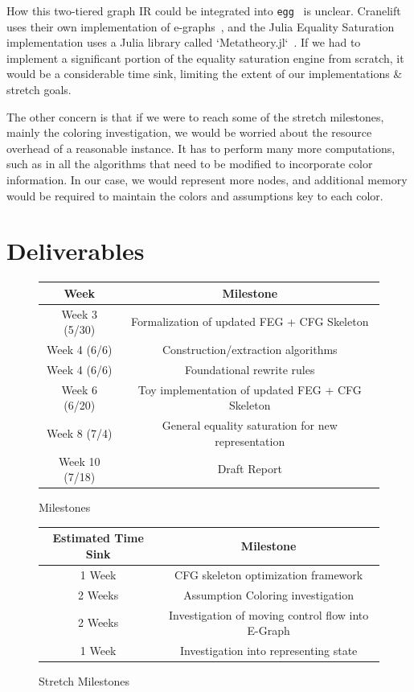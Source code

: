 \documentclass{article}
\begin{document}
How this two-tiered graph IR could be integrated into \verb|egg|~\cite{Willsey_2021} is unclear. Cranelift uses their own implementation of e-graphs~\cite{bytecodealliance_2025}, and the Julia Equality Saturation implementation uses a Julia library called `Metatheory.jl`~\cite{Cheli2021}. If we had to implement a significant portion of the equality saturation engine from scratch, it would be a considerable time sink, limiting the extent of our implementations \& stretch goals.

The other concern is that if we were to reach some of the stretch milestones, mainly the coloring investigation, we would be worried about the resource overhead of a reasonable instance. It has to perform many more computations, such as in all the algorithms that need to be modified to incorporate color information. In our case, we would represent more nodes, and additional memory would be required to maintain the colors and assumptions key to each color.


\section{Deliverables}

\begin{figure}[H]
    \centering
    \begin{tabular}{||c|c||}\hline
        Week            & Milestone\\ [0.5ex] \hline\hline
        Week 3 (5/30)   & Formalization of updated FEG + CFG Skeleton \\\hline
        Week 4 (6/6)    & Construction/extraction algorithms \\\hline
        Week 4 (6/6)    & Foundational rewrite rules \\\hline
        Week 6 (6/20)   & Toy implementation of updated FEG + CFG Skeleton \\\hline
        Week 8 (7/4)    & General equality saturation for new representation \\\hline
        Week 10 (7/18)  & Draft Report \\\hline
    \end{tabular}
    \caption{Milestones}
\end{figure}

\begin{figure}[H]
    \centering
    \begin{tabular}{||c|c||}\hline
        Estimated Time Sink & Milestone \\ [0.5ex] \hline\hline
        1 Week & CFG skeleton optimization framework \\\hline
        2 Weeks & Assumption Coloring investigation \\\hline
        2 Weeks & Investigation of moving control flow into E-Graph \\\hline
        1 Week  & Investigation into representing state \\\hline
    \end{tabular}
    \caption{Stretch Milestones}
\end{figure}
\end{document}
